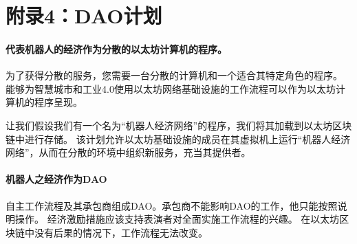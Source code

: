 \documentclass[UTF8]{article}
\begin{document}
\section*{附录4：DAO计划}

\paragraph{代表机器人的经济作为分散的以太坊计算机的程序。}

为了获得分散的服务，您需要一台分散的计算机和一个适合其特定角色的程序。 能够为智慧城市和工业4.0使用以太坊网络基础设施的工作流程可以作为以太坊计算机的程序呈现。

让我们假设我们有一个名为“机器人经济网络”的程序，我们将其加载到以太坊区块链中进行存储。 该计划允许以太坊基础设施的成员在其虚拟机上运行“机器人经济网络”，从而在分散的环境中组织新服务，充当其提供者。

\paragraph{机器人之经济作为DAO}

自主工作流程及其承包商组成DAO。承包商不能影响DAO的工作，他只能按照说明操作。 经济激励措施应该支持表演者对全面实施工作流程的兴趣。 在以太坊区块链中没有后果的情况下，工作流程无法改变。

\end{document}
